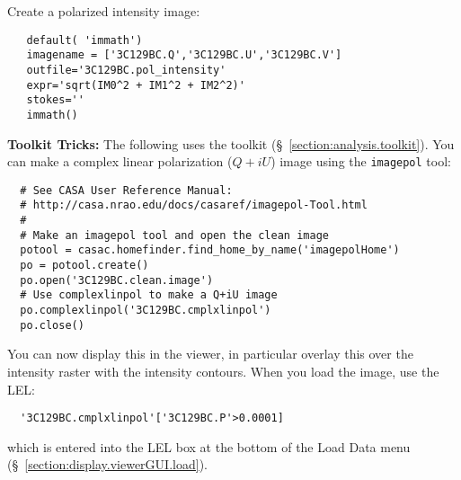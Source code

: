 Create a polarized intensity image:
\small
\begin{verbatim}
   default( 'immath')
   imagename = ['3C129BC.Q','3C129BC.U','3C129BC.V']
   outfile='3C129BC.pol_intensity'
   expr='sqrt(IM0^2 + IM1^2 + IM2^2)'
   stokes=''
   immath()
\end{verbatim}
\normalsize

{\bf Toolkit Tricks:} The following uses the toolkit 
(\S~\ref{section:analysis.toolkit}).
You can make a complex linear polarization ($Q+iU$) image using the
{\tt imagepol} tool:
\small
\begin{verbatim}
  # See CASA User Reference Manual:
  # http://casa.nrao.edu/docs/casaref/imagepol-Tool.html
  #
  # Make an imagepol tool and open the clean image 
  potool = casac.homefinder.find_home_by_name('imagepolHome')
  po = potool.create()
  po.open('3C129BC.clean.image')
  # Use complexlinpol to make a Q+iU image
  po.complexlinpol('3C129BC.cmplxlinpol')
  po.close()
\end{verbatim}
\normalsize
You can now display this in the viewer, in particular overlay this
over the intensity raster with the intensity contours.  
When you load the image, use the LEL:
\small
\begin{verbatim}
  '3C129BC.cmplxlinpol'['3C129BC.P'>0.0001]
\end{verbatim}
\normalsize
which is entered into the LEL box at the bottom of the Load Data menu
(\S~\ref{section:display.viewerGUI.load}).

%
%
%
%
%

